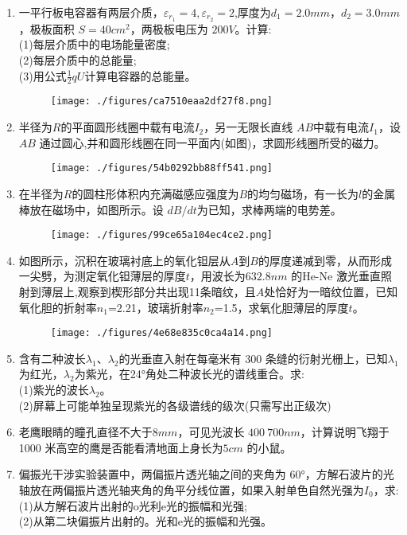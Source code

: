 \begin{enumerate}
\begin{figure}[ht]
\end{figure}
\item 一平行板电容器有两层介质，$\varepsilon_{r_1}=4,\varepsilon_{r_2}=2$,厚度为$ d_1=2.0mm$，$d_2=3.0mm$，极板面积 $S=40cm^2$，两极板电压为 $200V$。计算:\\
(1)每层介质中的电场能量密度;\\
(2)每层介质中的总能量;\\
(3)用公式$\frac{1}{2}qU$计算电容器的总能量。
\begin{figure}[ht]
\centering
\texttt{[image: ./figures/ca7510eaa2df27f8.png]}
\caption{} \label{fig_SD05_5}
\end{figure}
\item 半径为$R$的平面圆形线圈中载有电流$I_2$，另一无限长直线 $AB $中载有电流$I_1$，设 $AB$ 通过圆心,并和圆形线圈在同一平面内(如图)，求圆形线圈所受的磁力。
\begin{figure}[ht]
\centering
\texttt{[image: ./figures/54b0292bb88ff541.png]}
\caption{} \label{fig_SD05_6}
\end{figure}
\item 在半径为$R$的圆柱形体积内充满磁感应强度为$B$的均匀磁场，有一长为$l$的金属棒放在磁场中，如图所示。设 $dB/dt $为已知，求棒两端的电势差。
\begin{figure}[ht]
\centering
\texttt{[image: ./figures/99ce65a104ec4ce2.png]}
\caption{} \label{fig_SD05_7}
\end{figure}
\item 如图所示，沉积在玻璃衬底上的氧化钽层从$A$到$B$的厚度递减到零，从而形成一尖劈，为测定氧化钽薄层的厚度$t$，用波长为$632.8nm$ 的He-Ne 激光垂直照射到薄层上,观察到楔形部分共出现11条暗纹，且$A$处恰好为一暗纹位置，已知氧化胆的折射率$n_1$=2.21，玻璃折射率$n_2$=1.5，求氧化胆薄层的厚度$t$。
\begin{figure}[ht]
\centering
\texttt{[image: ./figures/4e68e835c0ca4a14.png]}
\caption{} \label{fig_SD05_8}
\end{figure}
\item 含有二种波长$\lambda_1$、$\lambda_2$的光垂直入射在每毫米有 300 条缝的衍射光栅上，已知$\lambda_1$为红光，$\lambda_2$为紫光，在24°角处二种波长光的谱线重合。求:\\
(1)紫光的波长$\lambda_2$。\\
(2)屏幕上可能单独呈现紫光的各级谱线的级次(只需写出正级次)
\item 老鹰眼睛的瞳孔直径不大于$ 8mm$，可见光波长 $400~700nm$，计算说明飞翔于 1000 米高空的鹰是否能看清地面上身长为$5cm$ 的小鼠。
\item 偏振光干涉实验装置中，两偏振片透光轴之间的夹角为 60°，方解石波片的光轴放在两偏振片透光轴夹角的角平分线位置，如果入射单色自然光强为$I_0$，求:\\
(1)从方解石波片出射的o光利e光的振幅和光强;\\
(2)从第二块偏振片出射的。光和e光的振幅和光强。
\end{enumerate}